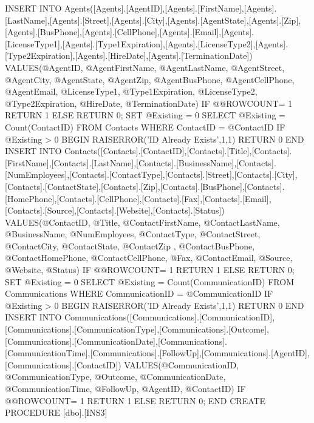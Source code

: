 	INSERT INTO Agents([Agents].[AgentID],[Agents].[FirstName],[Agents].[LastName],[Agents].[Street],[Agents].[City],[Agents].[AgentState],[Agents].[Zip],[Agents].[BusPhone],[Agents].[CellPhone],[Agents].[Email],[Agents].[LicenseType1],[Agents].[Type1Expiration],[Agents].[LicenseType2],[Agents].[Type2Expiration],[Agents].[HireDate],[Agents].[TerminationDate])			
		VALUES(@AgentID,		   @AgentFirstName,     @AgentLastName,     @AgentStreet,     @AgentCity,     @AgentState,          @AgentZip,     @AgentBusPhone,     @AgentCellPhone,     @AgentEmail,     @LicenseType1,          @Type1Expiration,          @LicenseType2,          @Type2Expiration,          @HireDate,          @TerminationDate)
	IF @@ROWCOUNT= 1
				RETURN 1
			ELSE
				RETURN 0;
SET @Existing  = 0
SELECT @Existing = Count(ContactID)
FROM Contacts
WHERE ContactID = @ContactID
IF @Existing > 0 BEGIN
	RAISERROR('ID Already Exists',1,1)
	RETURN 0
END
INSERT INTO Contacts([Contacts].[ContactID],[Contacts].[Title],[Contacts].[FirstName],[Contacts].[LastName],[Contacts].[BusinessName],[Contacts].[NumEmployees],[Contacts].[ContactType],[Contacts].[Street],[Contacts].[City],[Contacts].[ContactState],[Contacts].[Zip],[Contacts].[BusPhone],[Contacts].[HomePhone],[Contacts].[CellPhone],[Contacts].[Fax],[Contacts].[Email],[Contacts].[Source],[Contacts].[Website],[Contacts].[Status])	
	VALUES(@ContactID,			 @Title,	        @ContactFirstName,	   @ContactLastName,     @BusinessName,	           @NumEmployees,            @ContactType,            @ContactStreet,     @ContactCity,     @ContactState,            @ContactZip ,    @ContactBusPhone,     @ContactHomePhone,     @ContactCellPhone,     @Fax,            @ContactEmail,     @Source,            @Website,            @Status)        
	IF @@ROWCOUNT= 1
				RETURN 1
			ELSE
				RETURN 0;
SET @Existing  = 0
SELECT @Existing = Count(CommunicationID)
FROM Communications
WHERE CommunicationID = @CommunicationID
IF @Existing > 0 
BEGIN
	RAISERROR('ID Already Exists',1,1)
	RETURN 0
END
INSERT INTO	Communications([Communications].[CommunicationID],[Communications].[CommunicationType],[Communications].[Outcome],[Communications].[CommunicationDate],[Communications].[CommunicationTime],[Communications].[FollowUp],[Communications].[AgentID],[Communications].[ContactID])	
	VALUES(@CommunicationID,				   @CommunicationType,                  @Outcome,                  @CommunicationDate,                  @CommunicationTime,                  @FollowUp,					 @AgentID,		            @ContactID)             			
			IF @@ROWCOUNT= 1
				RETURN 1
			ELSE
				RETURN 0;
END
CREATE PROCEDURE [dbo].[INS3]

